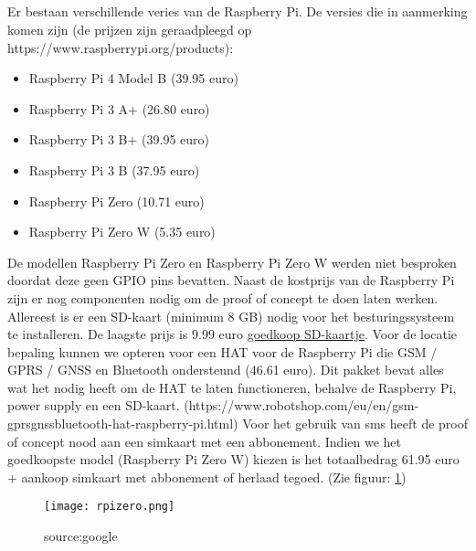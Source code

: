\subsection{}
Er bestaan verschillende veries van de Raspberry Pi. De versies die in aanmerking komen zijn (de prijzen zijn geraadpleegd op https://www.raspberrypi.org/products):
\begin{itemize}
    \item Raspberry Pi 4 Model B (39.95 euro)
    \item Raspberry Pi 3 A+ (26.80 euro)
    \item Raspberry Pi 3 B+ (39.95 euro)
    \item Raspberry Pi 3 B (37.95 euro)
    \item Raspberry Pi Zero (10.71 euro)
    \item Raspberry Pi Zero W (5.35 euro)
\end{itemize}
De modellen Raspberry Pi Zero en Raspberry Pi Zero W werden niet besproken doordat deze geen GPIO pins bevatten. 
\newline
Naast de kostprijs van de Raspberry Pi zijn er nog componenten nodig om de proof of concept te doen laten werken. 
Allereest is er een SD-kaart (minimum 8 GB) nodig voor het besturingssysteem te installeren. De laagste prijs is 9.99 euro \href{https://www.bol.com/nl/p/philips-sd-kaart-8gb-sd-card-class-4/9200000023935849/?country=BE&Referrer=ADVNLPPcefd2c00d536683c00927aff17000051123&utm_source=51123&utm_medium=Affiliates&utm_campaign=CPS&utm_content=txl}{goedkoop SD-kaartje}.
\newline
Voor de locatie bepaling kunnen we opteren voor een HAT voor de Raspberry Pi die GSM / GPRS / GNSS en Bluetooth ondersteund (46.61 euro). Dit pakket bevat alles wat het nodig heeft om de HAT te laten functioneren, behalve de Raspberry Pi, power supply en een SD-kaart. (https://www.robotshop.com/eu/en/gsm-gprsgnssbluetooth-hat-raspberry-pi.html)
\newline
Voor het gebruik van sms heeft de proof of concept nood aan een simkaart met een abbonement.
\newline
Indien we het goedkoopste model (Raspberry Pi Zero W) kiezen is het totaalbedrag 61.95 euro + aankoop simkaart met abbonement of herlaad tegoed. (Zie figuur: \ref{fig:rpi})
\begin{figure}
    \texttt{[image: rpizero.png]}
    \caption{source:google}
    \label{fig:rpi}
\end{figure}
